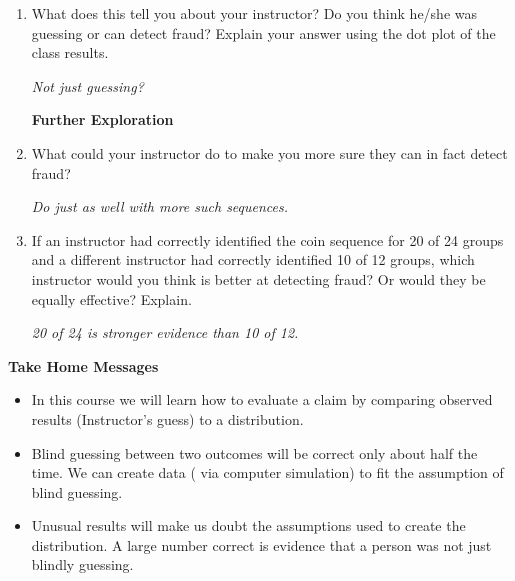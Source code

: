 \begin{enumerate}
  \item What does this tell you about your instructor?  Do you think
    he/she was guessing or can detect fraud?  Explain your answer
    using the dot plot of the class results. 
\begin{students}
  \vspace{1cm}
\end{students}    
\begin{key}
   {\it Not just guessing?}
\end{key}

\textbf{Further Exploration}

  \item What could your instructor do to make you more sure they 
        can in fact detect fraud? 
\begin{students}
  \vspace{1cm}
\end{students}    
\begin{key}
   {\it Do just as well with more such sequences.}
\end{key}

  \item If an instructor had correctly identified the coin sequence
    for 20 of 24 groups and a different instructor had correctly
    identified 10 of 12 groups, which instructor would you think is
    better at detecting fraud?  Or would they be equally effective?
    Explain.  
\begin{students}
  \vspace{1cm}
\end{students}    
\begin{key}
   {\it 20 of 24 is stronger evidence than 10 of 12.}
\end{key}
\end{enumerate}

\begin{center}
  {\bf Take Home Messages}
\end{center}
  \begin{itemize}
  \item In this course we will learn how to evaluate a claim by
    comparing observed results (Instructor's guess) to a distribution.

  \item Blind guessing between two outcomes will be correct only
    about half the time. We can create data ( via computer simulation)
    to fit the assumption of blind guessing.

  \item Unusual results will make us doubt the assumptions used to
    create the distribution.  A large number correct is evidence that
    a person was not just blindly guessing.
  \end{itemize} \vspace{1in}

